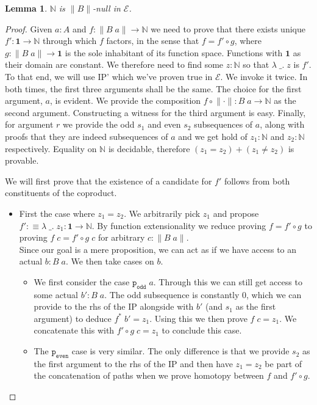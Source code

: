 \documentclass[12pt]{report}
\newtheorem{lem}[thm]{Lemma}
\begin{document}
\begin{lem}\label{NisBnull}
$\mathbb{N}$ is $\lVert B \rVert$-null in $\mathcal{E}$.
\end{lem}
\begin{proof}
Given $a : A$ and $f : \lVert B\; a \rVert \rightarrow \mathbb{N}$ we need to prove that there exists unique $f' : \mathbf{1} \rightarrow \mathbb{N}$ through which $f$ factors, in the sense that $f = f' \circ g$, where $g : \lVert B\; a \rVert \rightarrow \mathbf{1}$ is the sole inhabitant of its function space. 
Functions with $\mathbf{1}$ as their domain are constant. 
We therefore need to find some $z : \mathbb{N}$ so that $\lambda\; \_.\; z$ is $f'$. 
To that end, we will use IP' which we've proven true in $\mathcal{E}$. 
We invoke it twice. 
In both times, the first three arguments shall be the same. 
The choice for the first argument, $a$, is evident. 
We provide the composition $f \circ \lVert\cdot\rVert : B\; a \rightarrow \mathbb{N}$ as the second argument. 
Constructing a witness for the third argument is easy. 
Finally, for argument $r$ we provide the odd $s_1$ and even $s_2$ subsequences of $a$, along with proofs that they are indeed subsequences of $a$ and we get hold of $z_1 : \mathbb{N}$ and $z_2 : \mathbb{N} $ respectively. 
Equality on $\mathbb{N}$ is decidable, therefore $(z_1 = z_2) + (z_1 \neq z_2)$ is provable. 

We will first prove that the existence of a candidate for $f'$ follows from both constituents of the coproduct.
\begin{itemize}
\item First the case where $z_1= z_2$. 
We arbitrarily pick $z_1$ and propose $f' : \equiv \lambda \;\_.\; z_1 : \mathbf{1} \rightarrow \mathbb{N}$. 
By function extensionality we reduce proving $f= f' \circ g$ to proving $f\; c = f'\circ g\; c$ for arbitrary $c : \lVert B\; a\rVert$. \\
Since our goal is a mere proposition, we can act as if we have access to an actual $b : B\; a$. 
We then take cases on $b$.  
\begin{itemize}
\item We first consider the case $\mathtt{p_{odd}}\; a$. 
Through this we can still get access to some actual $b' : B\; a$. 
The odd subsequence is constantly $0$, which we can provide to the rhs of the IP alongside with $b'$ (and $s_1$ as the first argument) to deduce $f^*\; b' = z_1$. 
Using this we then prove $f\; c = z_1$. 
We concatenate this with $f' \circ g \; c = z_1$ to conclude this case. 
\item The $\mathtt{p_{even}}$ case is very similar. 
The only difference is that we provide $s_2$ as the first argument to the rhs of the IP and then have $z_1=z_2$ be part of the concatenation of paths when we prove homotopy between $f$ and $f' \circ g$. 
\end{itemize}


\end{itemize}
\end{proof}
\end{document}
